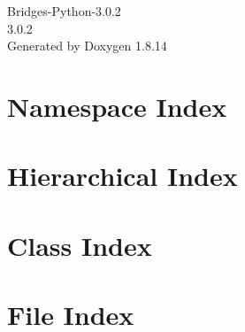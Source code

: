 \documentclass[twoside]{book}
\newcommand{\+}{\discretionary{\mbox{\scriptsize$\hookleftarrow$}}{}{}}
\newcommand{\clearemptydoublepage}{%
  \newpage{\pagestyle{empty}\cleardoublepage}%
}
\begin{document}
\hypersetup{pageanchor=false,
             bookmarksnumbered=true,
             pdfencoding=unicode
            }
\begin{titlepage}
\vspace*{7cm}
\begin{center}%
{\Large Bridges-\/\+Python-\/3.0.2 \\[1ex]\large 3.\+0.\+2 }\\
\vspace*{1cm}
{\large Generated by Doxygen 1.8.14}\\
\end{center}
\end{titlepage}
\clearemptydoublepage
{}
\tableofcontents
\clearemptydoublepage
{}
\hypersetup{pageanchor=true}

\chapter{Namespace Index}

\chapter{Hierarchical Index}

\chapter{Class Index}

\chapter{File Index}

\end{document}
